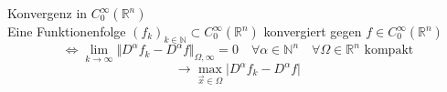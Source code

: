     \begin{Def}{Konvergenz in $C_0^{\infty}(\mathbb{R}^n)$ \\}
        Eine Funktionenfolge $(f_k)_{k \in \mathbb{N}} \subset C_0^{\infty}(\mathbb{R}^n)$ konvergiert gegen
        $f \in C_0^{\infty}(\mathbb{R}^n)$
        $$\Leftrightarrow \lim_{k\rightarrow \infty} \Vert D^\alpha f_k - D^\alpha f \Vert _{\Omega , \infty} = 0 \quad \forall 
        \alpha \in \mathbb{N}^n \quad \forall \Omega \in \mathbb{R}^n \textrm{ kompakt} $$
        $$ \rightarrow \max_{\vec{x} \in \Omega} \vert D^\alpha f_k - D^\alpha f \vert$$
    \end{Def}